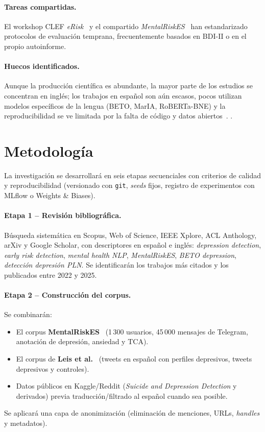 \documentclass[12pt,a4paper,spanish]{article}
\begin{document}
\paragraph{Tareas compartidas.} El workshop CLEF \emph{eRisk}~\cite{losada2017erisk} y el compartido \emph{MentalRiskES}~\cite{aclanthology2024mentalriskes} han estandarizado protocolos de evaluación temprana, frecuentemente basados en BDI-II o en el propio autoinforme.

\paragraph{Huecos identificados.} Aunque la producción científica es abundante, la mayor parte de los estudios se concentran en inglés; los trabajos en español son aún escasos, pocos utilizan modelos específicos de la lengua (BETO, MarIA, RoBERTa-BNE) y la reproducibilidad se ve limitada por la falta de código y datos abiertos~\cite{reviberopsicologia2024,dialnet2024}. .

\newpage
\section{Metodología}

La investigación se desarrollará en seis etapas secuenciales con criterios de calidad y reproducibilidad (versionado con \texttt{git}, \emph{seeds} fijos, registro de experimentos con MLflow o Weights \& Biases).

\paragraph{Etapa 1 -- Revisión bibliográfica.} Búsqueda sistemática en Scopus, Web of Science, IEEE Xplore, ACL Anthology, arXiv y Google Scholar, con descriptores en español e inglés: \emph{depression detection}, \emph{early risk detection}, \emph{mental health NLP}, \emph{MentalRiskES}, \emph{BETO depression}, \emph{detección depresión PLN}. Se identificarán los trabajos más citados y los publicados entre 2022 y 2025.

\paragraph{Etapa 2 -- Construcción del corpus.} Se combinarán:
\begin{itemize}[leftmargin=2em]
    \item El corpus \textbf{MentalRiskES}~\cite{aclanthology2024mentalriskes} (1\,300 usuarios, 45\,000 mensajes de Telegram, anotación de depresión, ansiedad y TCA).
    \item El corpus de \textbf{Leis et al.}~\cite{jmir2019spanish} (tweets en español con perfiles depresivos, tweets depresivos y controles).
    \item Datos públicos en Kaggle/Reddit (\emph{Suicide and Depression Detection} y derivados) previa traducción/filtrado al español cuando sea posible.
\end{itemize}
Se aplicará una capa de anonimización (eliminación de menciones, URLs, \emph{handles} y metadatos).
\end{document}
